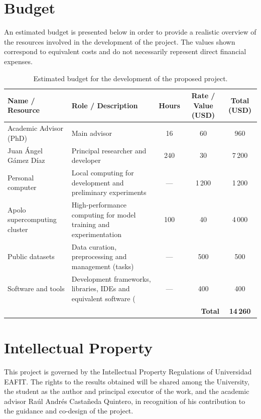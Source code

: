 \documentclass[12pt,letterpaper]{article}     %
\begin{document}
\section{Budget}
An estimated budget is presented below in order to provide a realistic overview of the resources involved in the development of the project. The values shown correspond to equivalent costs and do not necessarily represent direct financial expenses.
\begin{table}[H]
\centering
\scriptsize
\renewcommand{\arraystretch}{1.2}
\begin{tabular}{|p{3.8cm}|p{3.8cm}|c|c|c|}
\hline
\textbf{Name / Resource} & \textbf{Role / Description} & \textbf{Hours} & \textbf{Rate / Value (USD)} & \textbf{Total (USD)} \\
\hline
Academic Advisor (PhD) & Main advisor & 16 & 60 & 960 \\
\hline
Juan Ángel Gámez Díaz & Principal researcher and developer & 240 & 30 & 7\,200 \\
\hline
Personal computer & Local computing for development and preliminary experiments & --- & 1\,200 & 1\,200 \\
\hline
Apolo supercomputing cluster & High-performance computing for model training and experimentation & 100 & 40 & 4\,000 \\
\hline
Public datasets & Data curation, preprocessing and management (tasks) & --- & 500 & 500 \\
\hline
Software and tools & Development frameworks, libraries, IDEs and equivalent software ( & --- & 400 & 400 \\
\hline
\multicolumn{4}{|r|}{\textbf{Total}} & \textbf{14\,260} \\
\hline
\end{tabular}
\caption{Estimated budget for the development of the proposed project.}
\end{table}





\section{Intellectual Property}

This project is governed by the Intellectual Property Regulations of Universidad EAFIT. The rights to the results obtained will be shared among the University, the student as the author and principal executor of the work, and the academic advisor Raúl Andrés Castañeda Quintero, in recognition of his contribution to the guidance and co-design of the project. 
\end{document}
